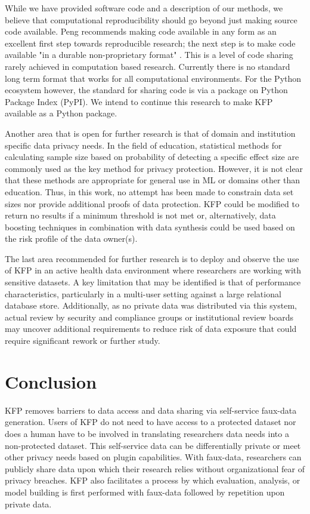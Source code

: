 \documentclass{amia}
\begin{document}
While we have provided software code and a description of our methods, we believe that computational reproducibility should go beyond just making source code available. Peng recommends making code available in any form as an excellent first step towards reproducible research; the next step is to make code available "in a durable non-proprietary format" \cite{peng_reproducible_2011}. This is a level of code sharing rarely achieved in computation based research. Currently there is no standard long term format that works for all computational environments. For the Python ecosystem however, the standard for sharing code is via a package on Python Package Index (PyPI). We intend to continue this research to make KFP available as a Python package.

Another area that is open for further research is that of domain and institution specific data privacy needs. In the field of education, statistical methods for calculating sample size based on probability of detecting a specific effect size are commonly used \cite{naep_2009} as the key method for privacy protection. However, it is not clear that these methods are appropriate for general use in ML or domains other than education. Thus, in this work, no attempt has been made to constrain data set sizes nor provide additional proofs of data protection. KFP could be modified to return no results if a minimum threshold is not met or, alternatively, data boosting techniques in combination with data synthesis could be used based on the risk profile of the data owner(s).

The last area recommended for further research is to deploy and observe the use of KFP in an active health data environment where researchers are working with sensitive datasets. A key limitation that may be identified is that of performance characteristics, particularly in a multi-user setting against a large relational database store. Additionally, as no private data was distributed via this system, actual review by security and compliance groups or institutional review boards may uncover additional requirements to reduce risk of data exposure that could require significant rework or further study.

\section{Conclusion}

KFP removes barriers to data access and data sharing via self-service faux-data generation. Users of KFP do not need to have access to a protected dataset nor does a human have to be involved in translating researchers data needs into a non-protected dataset. This self-service data can be differentially private or meet other privacy needs based on plugin capabilities. With faux-data, researchers can publicly share data upon which their research relies without organizational fear of privacy breaches. KFP also facilitates a process by which evaluation, analysis, or model building is first performed with faux-data followed by repetition upon private data. 
\end{document}
